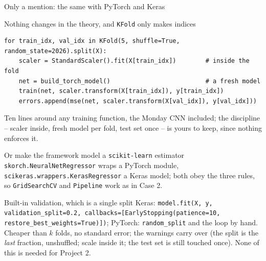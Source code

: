 \documentclass[10pt,aspectratio=169]{beamer}
\begin{document}
\begin{frame}[fragile]{Only a mention: the same with PyTorch and Keras}
\small
\begin{block}{Nothing changes in the theory, and \texttt{KFold} only makes indices}
\begin{lstlisting}
for train_idx, val_idx in KFold(5, shuffle=True, random_state=2026).split(X):
    scaler = StandardScaler().fit(X[train_idx])        # inside the fold
    net = build_torch_model()                          # a fresh model
    train(net, scaler.transform(X[train_idx]), y[train_idx])
    errors.append(mse(net, scaler.transform(X[val_idx]), y[val_idx]))
\end{lstlisting}
Ten lines around any training function, the Monday CNN included; the
discipline -- scaler inside, fresh model per fold, test set once -- is
yours to keep, since nothing enforces it.
\end{block}
\begin{block}{Or make the framework model a \texttt{scikit-learn} estimator}
\texttt{skorch.NeuralNetRegressor} wraps a PyTorch module,
\texttt{scikeras.wrappers.KerasRegressor} a Keras model; both obey the
three rules, so \texttt{GridSearchCV} and \texttt{Pipeline} work as in
Case 2.
\end{block}
\begin{block}{Built-in validation, which is a single split}
Keras: \texttt{model.fit(X, y, validation\_split=0.2,
callbacks=[EarlyStopping(patience=10, restore\_best\_weights=True)])};
PyTorch: \texttt{random\_split} and the loop by hand.  Cheaper than $k$
folds, no standard error; the warnings carry over (the split is the
\emph{last} fraction, unshuffled; scale inside it; the test set is still
touched once).  None of this is needed for Project 2.
\end{block}
\end{frame}
\end{document}
